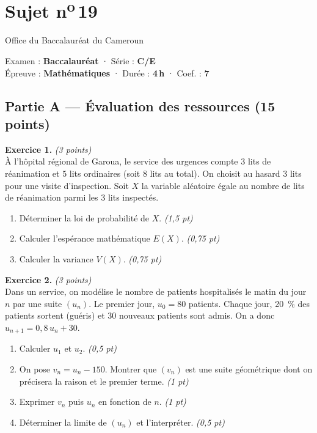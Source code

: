 \section{Sujet n\textsuperscript{o}\,19}
\noindent\begin{minipage}{0.5\linewidth}\footnotesize Office du Baccalauréat du Cameroun\end{minipage}%
\hfill\begin{minipage}{0.45\linewidth}\footnotesize\raggedleft Examen : \textbf{Baccalauréat} · Série : \textbf{C/E}\\
Épreuve : \textbf{Mathématiques} · Durée : \textbf{4\,h} · Coef. : \textbf{7}\end{minipage}
\par\smallskip{\color{onbo}\rule{\linewidth}{1pt}}

\subsection*{Partie A — Évaluation des ressources \hfill (15 points)}

\noindent\textbf{Exercice 1.} \hfill\textit{(3 points)}\\
À l'hôpital régional de Garoua, le service des urgences compte $3$ lits de
réanimation et $5$ lits ordinaires (soit $8$ lits au total). On choisit au hasard
$3$ lits pour une visite d'inspection. Soit $X$ la variable aléatoire égale au
nombre de lits de réanimation parmi les $3$ lits inspectés.
\begin{enumerate}[label=\arabic*)]
\item Déterminer la loi de probabilité de $X$. \hfill\textit{(1,5 pt)}
\item Calculer l'espérance mathématique $E(X)$. \hfill\textit{(0,75 pt)}
\item Calculer la variance $V(X)$. \hfill\textit{(0,75 pt)}
\end{enumerate}

\smallskip
\noindent\textbf{Exercice 2.} \hfill\textit{(3 points)}\\
Dans un service, on modélise le nombre de patients hospitalisés le matin du jour
$n$ par une suite $(u_n)$. Le premier jour, $u_0=80$ patients. Chaque jour,
\SI{20}{\percent} des patients sortent (guéris) et $30$ nouveaux patients sont
admis. On a donc $u_{n+1}=0{,}8\,u_n+30$.
\begin{enumerate}[label=\arabic*)]
\item Calculer $u_1$ et $u_2$. \hfill\textit{(0,5 pt)}
\item On pose $v_n=u_n-150$. Montrer que $(v_n)$ est une suite géométrique dont on
précisera la raison et le premier terme. \hfill\textit{(1 pt)}
\item Exprimer $v_n$ puis $u_n$ en fonction de $n$. \hfill\textit{(1 pt)}
\item Déterminer la limite de $(u_n)$ et l'interpréter. \hfill\textit{(0,5 pt)}
\end{enumerate}

